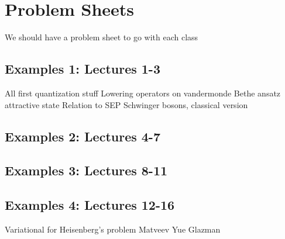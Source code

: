 \section{Problem Sheets}


We should have a problem sheet to go with each class

\subsection{Examples 1: Lectures 1-3}

All first quantization stuff
Lowering operators on vandermonde
Bethe ansatz attractive state
Relation to SEP
Schwinger bosons, classical version

\subsection{Examples 2: Lectures 4-7}

\subsection{Examples 3: Lectures 8-11}

\subsection{Examples 4: Lectures 12-16}


Variational for Heisenberg's problem
Matveev Yue Glazman
